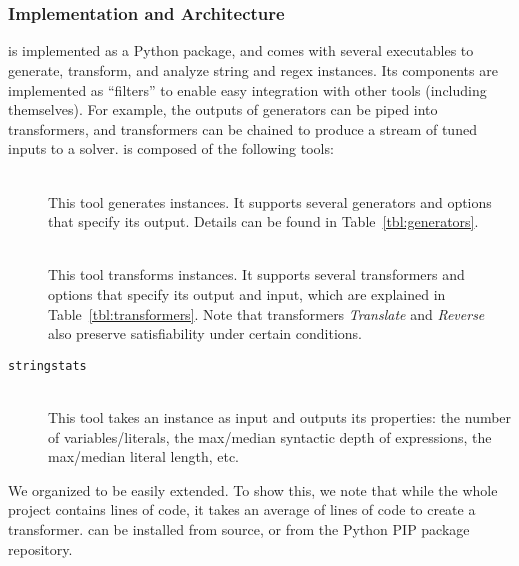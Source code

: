 \section{\fuzzer{}}
\label{sec:fuzzer}

\subsubsection{Implementation and Architecture}

\fuzzer{} is implemented as a Python package, and comes with several
executables to generate, transform, and analyze \smtfull{} string and regex
instances. Its components are implemented as \unix{} ``filters'' to enable easy
integration with other tools (including themselves). For example, the
outputs of generators can be piped into transformers, and transformers
can be chained to produce a stream of tuned inputs to a
solver. \fuzzer{} is composed of the following tools:
\begin{description}
    \item[\generator{}] \hfill \\
    This tool generates \smt{} instances. It supports several generators and
    options that specify its output. Details can be found in
    Table~\ref{tbl:generators}.
    \item[\transformer{}] \hfill \\
    This tool transforms \smt{}
    instances. It supports several transformers and options that specify
    its output and input, which are explained in
    Table~\ref{tbl:transformers}. Note that transformers
    \textit{Translate} and \textit{Reverse} also preserve
    satisfiability under certain conditions.
    \item[\texttt{stringstats}] \hfill \\
    This tool takes an \smt{}
    instance as input and outputs its properties: the number of
    variables/literals, the max/median syntactic depth of expressions, the
    max/median literal length, etc.
\end{description}
We organized \fuzzer{} to be easily extended. To show this, we note that while
the whole project contains \linesInFuzzer{} lines of code, it takes an
average of \linesPerX{} lines of code to create a transformer. \fuzzer{} can
be installed from source, or from the Python PIP package repository.

